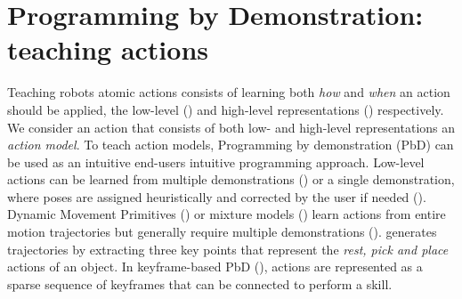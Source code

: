 \section{Programming by Demonstration: teaching actions}
Teaching robots atomic actions consists of learning both \textit{how} and \textit{when} an action should be applied, \ie the low-level () and high-level representations () respectively.
We consider an action that consists of both low- and high-level representations an \textit{action model}.
To teach action models, Programming by demonstration (PbD) can be used as an intuitive end-users intuitive programming approach.
Low-level actions can be learned from multiple demonstrations (\cite{niekum2012learning}) or a single demonstration, where poses are assigned heuristically and corrected by the user if needed (\cite{alexandrova2014robot}).
Dynamic Movement Primitives (\cite{pastor2009learning}) or mixture models (\cite{calinon2007incremental}) learn actions from entire motion trajectories but generally require multiple demonstrations (\cite{abdo2013learning}).
\cite{ahmadzadeh2013visuospatial} generates trajectories by extracting three key points that represent the \textit{rest, pick and place} actions of an object.
In keyframe-based PbD (\cite{akgun2012keyframe,alexandrova2014robot}), actions are represented as a sparse sequence of keyframes that can be connected to perform a skill.

